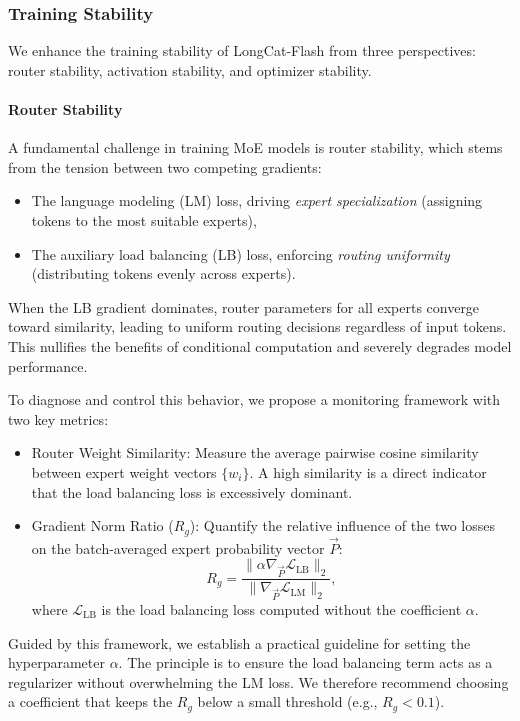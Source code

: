 \documentclass{article}
\newcommand{\longcat}{LongCat-Flash\xspace}
\begin{document}
\subsubsection{Training Stability}
We enhance the training stability of \longcat from three perspectives: router stability, activation stability, and optimizer stability.

\paragraph{Router Stability}
A fundamental challenge in training MoE models is router stability, which stems from the tension between two competing gradients: 
\begin{itemize}
    \item The language modeling (LM) loss, driving \textit{expert specialization} (assigning tokens to the most suitable experts),
    \item The auxiliary load balancing (LB) loss, enforcing \textit{routing uniformity} (distributing tokens evenly across experts).
\end{itemize}  
When the LB gradient dominates, router parameters for all experts converge toward similarity, leading to uniform routing decisions regardless of input tokens. This nullifies the benefits of conditional computation and severely degrades model performance.

To diagnose and control this behavior, we propose a monitoring framework with two key metrics:
\begin{itemize}
    \item Router Weight Similarity: Measure the average pairwise cosine similarity between expert weight vectors $\{w_i\}$. A high similarity is a direct indicator that the load balancing loss is excessively dominant.
    \item Gradient Norm Ratio ($R_g$): Quantify the relative influence of the two losses on the batch-averaged expert probability vector $\vec{P}$:
    \begin{equation}
        R_g = \frac{\|\alpha \nabla_{\vec{P}} \mathcal{L}_{\text{LB}}\|_2}{\|\nabla_{\vec{P}} \mathcal{L}_{\text{LM}}\|_2},
    \end{equation}
    where $\mathcal{L}_{\text{LB}}$ is the load balancing loss computed without the coefficient $\alpha$.
\end{itemize}

Guided by this framework, we establish a practical guideline for setting the hyperparameter $\alpha$. The principle is to ensure the load balancing term acts as a regularizer without overwhelming the LM loss. We therefore recommend choosing a coefficient that keeps the $R_g$ below a small threshold (e.g., $R_g < 0.1$).
\end{document}
